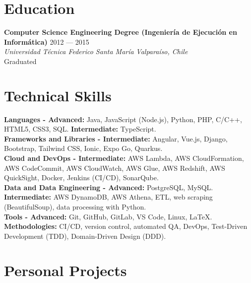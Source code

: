 \documentclass[11pt,a4paper]{article}
\begin{document}
\section*{Education}
\textbf{Computer Science Engineering Degree (Ingeniería de Ejecución en Informática)} \hfill 2012 --- 2015\\
\textit{Universidad Técnica Federico Santa María} \hfill \textit{Valparaíso, Chile}\\
Graduated

\section*{Technical Skills}
\textbf{Languages - Advanced:} Java, JavaScript (Node.js), Python, PHP, C/C++, HTML5, CSS3, SQL. \textbf{Intermediate:} TypeScript.\\
\textbf{Frameworks and Libraries - Intermediate:} Angular, Vue.js, Django, Bootstrap, Tailwind CSS, Ionic, Expo Go, Quarkus.\\
\textbf{Cloud and DevOps - Intermediate:} AWS Lambda, AWS CloudFormation, AWS CodeCommit, AWS CloudWatch, AWS Glue, AWS Redshift, AWS QuickSight, Docker, Jenkins (CI/CD), SonarQube.\\
\textbf{Data and Data Engineering - Advanced:} PostgreSQL, MySQL.  \textbf{Intermediate:} AWS DynamoDB, AWS Athena, ETL, web scraping (BeautifulSoup), data processing with Python.\\
\textbf{Tools - Advanced:} Git, GitHub, GitLab, VS Code, Linux, \LaTeX.\\
\textbf{Methodologies:} CI/CD, version control, automated QA, DevOps, Test-Driven Development (TDD), Domain-Driven Design (DDD).\\

\section*{Personal Projects}
\end{document}
